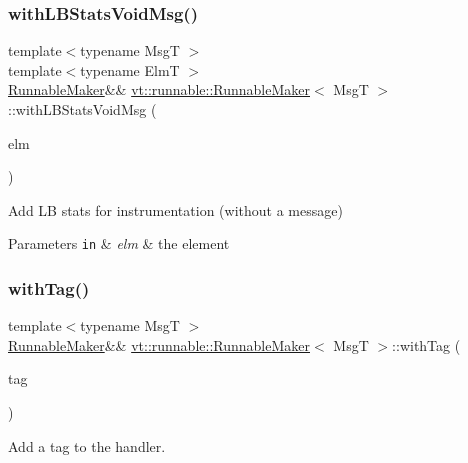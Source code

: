 \subsubsection{\texorpdfstring{with\+L\+B\+Stats\+Void\+Msg()}{withLBStatsVoidMsg()}}
{\footnotesize\ttfamily template$<$typename MsgT $>$ \\
template$<$typename ElmT $>$ \\
\hyperlink{structvt_1_1runnable_1_1_runnable_maker}{Runnable\+Maker}\&\& \hyperlink{structvt_1_1runnable_1_1_runnable_maker}{vt\+::runnable\+::\+Runnable\+Maker}$<$ MsgT $>$\+::with\+L\+B\+Stats\+Void\+Msg (\begin{DoxyParamCaption}\item[{ElmT $\ast$}]{elm }\end{DoxyParamCaption})\hspace{0.3cm}{\ttfamily [inline]}}



Add LB stats for instrumentation (without a message) 


\begin{DoxyParams}[1]{Parameters}
\mbox{\tt in}  & {\em elm} & the element \\
\hline
\end{DoxyParams}
\mbox{\label{structvt_1_1runnable_1_1_runnable_maker_a3a22a3b3952eb54f07e610000f833d7e}} 
\subsubsection{\texorpdfstring{with\+Tag()}{withTag()}}
{\footnotesize\ttfamily template$<$typename MsgT $>$ \\
\hyperlink{structvt_1_1runnable_1_1_runnable_maker}{Runnable\+Maker}\&\& \hyperlink{structvt_1_1runnable_1_1_runnable_maker}{vt\+::runnable\+::\+Runnable\+Maker}$<$ MsgT $>$\+::with\+Tag (\begin{DoxyParamCaption}\item[{\hyperlink{namespacevt_a84ab281dae04a52a4b243d6bf62d0e52}{Tag\+Type}}]{tag }\end{DoxyParamCaption})\hspace{0.3cm}{\ttfamily [inline]}}



Add a tag to the handler. 



